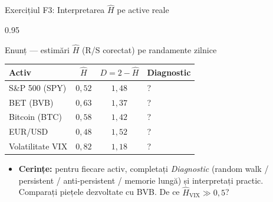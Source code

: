\documentclass[9pt, aspectratio=169, t]{beamer}
\begin{document}
\begin{frame}[shrink=25]{Exercițiul F3: Interpretarea $\hat H$ pe active reale}
\begin{cminipage}{0.95\textwidth}
\begin{block}{Enunț --- estimări $\hat H$ (R/S corectat) pe randamente zilnice}
\small
\renewcommand{\arraystretch}{1.2}
\begin{center}
\begin{tabular}{lccl}
\toprule
\textbf{Activ} & $\hat H$ & $D = 2 - \hat H$ & \textbf{Diagnostic} \\
\midrule
S\&P 500 (SPY) & $0{,}52$ & $1{,}48$ & ? \\
BET (BVB) & $0{,}63$ & $1{,}37$ & ? \\
Bitcoin (BTC) & $0{,}58$ & $1{,}42$ & ? \\
EUR/USD & $0{,}48$ & $1{,}52$ & ? \\
Volatilitate VIX & $0{,}82$ & $1{,}18$ & ? \\
\bottomrule
\end{tabular}
\end{center}
\end{block}
\begin{itemize}\setlength{\itemsep}{0pt}
    \item \textbf{Cerințe:} pentru fiecare activ, completați \emph{Diagnostic} (random walk / persistent / anti-persistent / memorie lungă) și interpretați practic. Comparați piețele dezvoltate cu BVB. De ce $\hat H_{\text{VIX}} \gg 0{,}5$?
\end{itemize}
\end{cminipage}
\end{frame}
\end{document}
